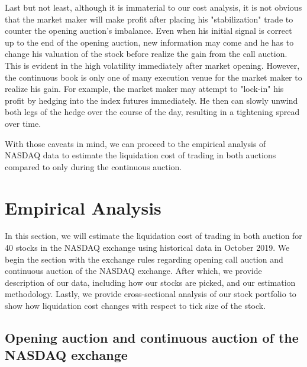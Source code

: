 \documentclass{article}
\begin{document}
Last but not least, although it is immaterial to our cost analysis, it is not obvious that the market maker will make profit after placing his "stabilization" trade to counter the opening auction's imbalance. Even when his initial signal is correct up to the end of the opening auction, new information may come and he has to change his valuation of the stock before realize the gain from the call auction. This is evident in the high volatility immediately after market opening. However, the continuous book is only one of many execution venue for the market maker to realize his gain. For example, the market maker may attempt to "lock-in" his profit by hedging into the index futures immediately. He then can slowly unwind both legs of the hedge over the course of the day, resulting in a tightening spread over time.

With those caveats in mind, we can proceed to the empirical analysis of NASDAQ data to estimate the liquidation cost of trading in both auctions compared to only during the continuous auction.

\section{Empirical Analysis}\label{sec:EmpiricalAnalysis}

In this section, we will estimate the liquidation cost of trading in both auction for 40 stocks in the NASDAQ exchange using historical data in October 2019. We begin the section with the exchange rules regarding opening call auction and continuous auction of the NASDAQ exchange. After which, we provide description of our data, including how our stocks are picked, and our estimation methodology. Lastly, we provide cross-sectional analysis of our stock portfolio to show how liquidation cost changes with respect to tick size of the stock.

\subsection{Opening auction and continuous auction of the NASDAQ exchange}
\end{document}
